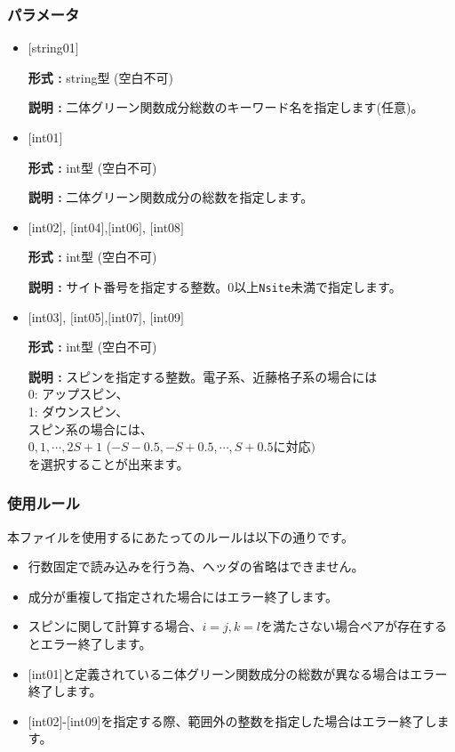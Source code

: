 \subsubsection{パラメータ}
 \begin{itemize}

   \item  $[$string01$]$
   
    {\bf 形式 :} string型 (空白不可)

   {\bf 説明 :} 二体グリーン関数成分総数のキーワード名を指定します(任意)。

   \item  $[$int01$]$
   
    {\bf 形式 :} int型 (空白不可)

   {\bf 説明 :} 二体グリーン関数成分の総数を指定します。

  \item  $[$int02$]$, $[$int04$]$,$[$int06$]$, $[$int08$]$

 {\bf 形式 :} int型 (空白不可)

{\bf 説明 :} サイト番号を指定する整数。0以上\verb|Nsite|{未満}で指定します。
 
  \item  $[$int03$]$, $[$int05$]$,$[$int07$]$, $[$int09$]$

 {\bf 形式 :} int型 (空白不可)

{\bf 説明 :} スピンを指定する整数。電子系、近藤格子系の場合には\\
0: アップスピン、\\
1: ダウンスピン、\\
スピン系の場合には、\\
$0, 1, \cdots, 2S+1$ ($-S-0.5, -S+0.5, \cdots, S+0.5$に対応$)$\\
を選択することが出来ます。


\end{itemize}

\subsubsection{使用ルール}
本ファイルを使用するにあたってのルールは以下の通りです。
\begin{itemize}
\item 行数固定で読み込みを行う為、ヘッダの省略はできません。
\item 成分が重複して指定された場合にはエラー終了します。
\item {スピンに関して計算する場合、$i=j, k=l$を満たさない場合ペアが存在するとエラー終了します。}
\item $[$int01$]$と定義されているニ体グリーン関数成分の総数が異なる場合はエラー終了します。
\item $[$int02$]$-$[$int09$]$を指定する際、範囲外の整数を指定した場合はエラー終了します。
\end{itemize}

